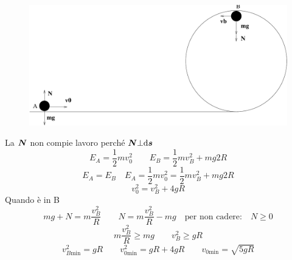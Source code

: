 \begin{Es}
  \begin{figure}[htbp]
    \centering
    \includegraphics[scale=0.4]{immagini/fisica1/arriva_in_alto}
  \end{figure}
  La $\boldsymbol{N}$ non compie lavoro perché $\boldsymbol{N}\bot \mathrm{d}\boldsymbol{s}$
  \[E_A=\frac{1}{2}mv_0^2 \qquad E_B=\frac{1}{2}mv_B^2+mg2R\]
  \[E_A=E_B \quad E_A=\frac{1}{2}mv_0^2=\frac{1}{2}mv_B^2+mg2R\]
  \[v_0^2=v_B^2+4gR\]
  Quando è in B
  \[mg+N=m\frac{v_B^2}{R}\qquad N=m\frac{v_B^2}{R}-mg\quad \text{per non cadere:}\quad N\geq0\]
  \[m\frac{v_B^2}{R}\geq mg\qquad v_B^2\geq gR\]
  \[v_{B\text{min}}^2=gR\qquad v_{0\text{min}}^2=gR+4gR\qquad v_{0\text{min}}=\sqrt{5gR}\]
\end{Es}